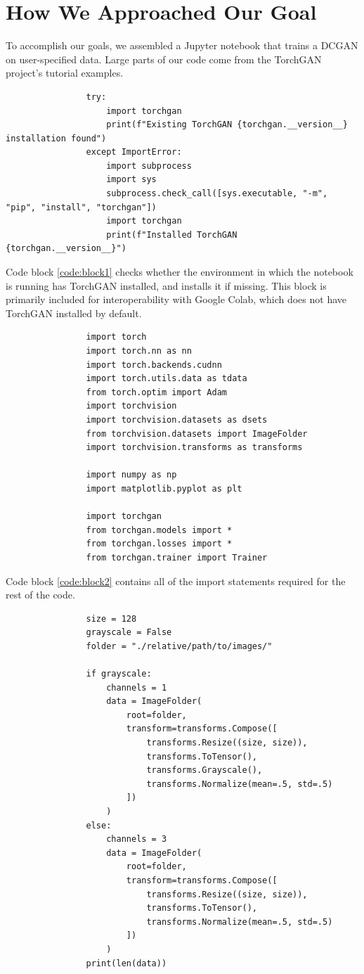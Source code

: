 \documentclass[11pt,letterpaper]{article}
\newenvironment{code}{\captionsetup{type=listing}}{}
\begin{document}
	\section{How We Approached Our Goal}
		To accomplish our goals, we assembled a Jupyter notebook that trains a DCGAN on user-specified data.
		Large parts of our code come from the TorchGAN\cite{pal2019torchgan} project's tutorial examples.
		\begin{code}
			\caption{}
			\begin{verbatim}
				try:
					import torchgan
					print(f"Existing TorchGAN {torchgan.__version__} installation found")
				except ImportError:
					import subprocess
					import sys
					subprocess.check_call([sys.executable, "-m", "pip", "install", "torchgan"])
					import torchgan
					print(f"Installed TorchGAN {torchgan.__version__}")
			\end{verbatim}
			\label{code:block1}
		\end{code}
		Code block \ref{code:block1} checks whether the environment in which the notebook is running has TorchGAN installed, and installs it if missing.
		This block is primarily included for interoperability with Google Colab, which does not have TorchGAN installed by default.
		\begin{code}
			\caption{}
			\begin{verbatim}
				import torch
				import torch.nn as nn
				import torch.backends.cudnn
				import torch.utils.data as tdata
				from torch.optim import Adam
				import torchvision
				import torchvision.datasets as dsets
				from torchvision.datasets import ImageFolder
				import torchvision.transforms as transforms

				import numpy as np
				import matplotlib.pyplot as plt

				import torchgan
				from torchgan.models import *
				from torchgan.losses import *
				from torchgan.trainer import Trainer
			\end{verbatim}
			\label{code:block2}
		\end{code}
		Code block \ref{code:block2} contains all of the import statements required for the rest of the code.
		\begin{code}
			\caption{}
			\begin{verbatim}
				size = 128
				grayscale = False
				folder = "./relative/path/to/images/"

				if grayscale:
					channels = 1
					data = ImageFolder(
						root=folder,
						transform=transforms.Compose([
							transforms.Resize((size, size)),
							transforms.ToTensor(),
							transforms.Grayscale(),
							transforms.Normalize(mean=.5, std=.5)
						])
					)
				else:
					channels = 3
					data = ImageFolder(
						root=folder,
						transform=transforms.Compose([
							transforms.Resize((size, size)),
							transforms.ToTensor(),
							transforms.Normalize(mean=.5, std=.5)
						])
					)
				print(len(data))
			\end{verbatim}
			\label{code:block3}
		\end{code}
\end{document}
